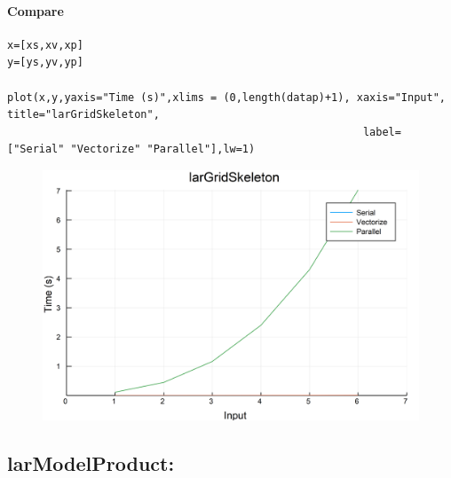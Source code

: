 \documentclass{article}
\begin{document}
\paragraph{Compare}
\begin{flushleft}\small
\begin{list}{}{} \item
    \begin{Verbatim}[tabsize=4]
x=[xs,xv,xp]
y=[ys,yv,yp]

plot(x,y,yaxis="Time (s)",xlims = (0,length(datap)+1), xaxis="Input", title="larGridSkeleton",
                                                        label=["Serial" "Vectorize" "Parallel"],lw=1)
    \end{Verbatim}
\end{list}
\end{flushleft}   
\begin{figure}[h!]
\centering
\includegraphics[scale=0.06]{larGridSkeletonCom.png}
\end{figure}

\subsection{larModelProduct:}
\end{document}
